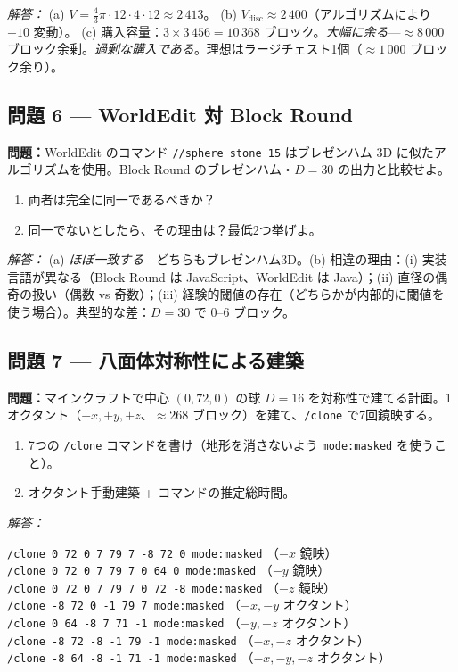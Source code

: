 \documentclass[12pt,a4paper]{scrartcl}
\newcommand{\cmd}[1]{\textcolor{earth}{\texttt{\small #1}}}
\begin{document}
\emph{解答：}
(a) $V = \tfrac{4}{3}\pi \cdot 12 \cdot 4 \cdot 12 \approx 2\,413$。
(b) $V_{\mathrm{disc}} \approx 2\,400$（アルゴリズムにより $\pm 10$ 変動）。
(c) 購入容量：$3 \times 3\,456 = 10\,368$ ブロック。\emph{大幅に余る}---$\approx 8\,000$ ブロック余剰。\emph{過剰な購入である}。理想はラージチェスト1個（$\approx 1\,000$ ブロック余り）。

\subsection*{問題 6 --- WorldEdit 対 Block Round}
\textbf{問題：}WorldEdit のコマンド \cmd{//sphere stone 15} はブレゼンハム 3D に似たアルゴリズムを使用。Block Round のブレゼンハム・$D = 30$ の出力と比較せよ。
\begin{enumerate}[label=\alph*),leftmargin=1.5em,itemsep=0.1em,topsep=0.2em,nosep]
  \item 両者は完全に同一であるべきか？
  \item 同一でないとしたら、その理由は？最低2つ挙げよ。
\end{enumerate}

\emph{解答：}
(a) \emph{ほぼ一致する}---どちらもブレゼンハム3D。(b) 相違の理由：(i) 実装言語が異なる（Block Round は JavaScript、WorldEdit は Java）；(ii) 直径の偶奇の扱い（偶数 vs 奇数）；(iii) 経験的閾値の存在（どちらかが内部的に閾値を使う場合）。典型的な差：$D = 30$ で 0--6 ブロック。

\subsection*{問題 7 --- 八面体対称性による建築}
\textbf{問題：}マインクラフトで中心 $(0, 72, 0)$ の球 $D = 16$ を対称性で建てる計画。1オクタント（$+x, +y, +z$、$\approx 268$ ブロック）を建て、\cmd{/clone} で7回鏡映する。
\begin{enumerate}[label=\alph*),leftmargin=1.5em,itemsep=0.1em,topsep=0.2em,nosep]
  \item 7つの \cmd{/clone} コマンドを書け（地形を消さないよう \cmd{mode:masked} を使うこと）。
  \item オクタント手動建築 + コマンドの推定総時間。
\end{enumerate}

\emph{解答：}

\begin{minecraft}[コマンド列]
\cmd{/clone 0 72 0 7 79 7 -8 72 0 mode:masked} \quad （$-x$ 鏡映）\\
\cmd{/clone 0 72 0 7 79 7 0 64 0 mode:masked} \quad\quad （$-y$ 鏡映）\\
\cmd{/clone 0 72 0 7 79 7 0 72 -8 mode:masked} \quad （$-z$ 鏡映）\\
\cmd{/clone -8 72 0 -1 79 7 mode:masked} \quad\quad\;\; （$-x,-y$ オクタント）\\
\cmd{/clone 0 64 -8 7 71 -1 mode:masked} \quad\quad\;\; （$-y,-z$ オクタント）\\
\cmd{/clone -8 72 -8 -1 79 -1 mode:masked} \quad\;\; （$-x,-z$ オクタント）\\
\cmd{/clone -8 64 -8 -1 71 -1 mode:masked} \quad\;\; （$-x,-y,-z$ オクタント）
\end{minecraft}
\end{document}
